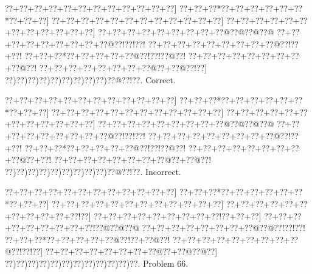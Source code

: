 \documentclass[a5paper]{article}
\begin{document}
\begin{center}
{\goo
\0??+\0??+\0??+\0??+\0??+\0??+\0??+\0??+\0??+\0??+\0??+\0??]
\0??+\0??+\0??*\0??+\0??+\0??+\0??+\0??+\0??*\0??+\0??+\0??]
\0??+\0??+\0??+\0??+\0??+\0??+\0??+\0??+\0??+\0??+\0??+\0??]
\0??+\0??+\0??+\0??+\0??+\0??+\0??+\0??+\0??+\0??+\0??+\0??]
\0??+\0??+\0??+\0??+\0??+\0??+\0??+\0??+\0??@\0??@\0??@\0??@
\0??+\0??+\0??+\0??+\0??+\0??+\0??+\0??+\0??@\0??!\0??!\0??!
\0??+\0??+\0??+\0??+\0??+\0??+\0??+\0??+\0??@\0??!\0??+\0??!
\0??+\0??+\0??*\0??+\0??+\0??+\0??+\0??@\0??!\0??!\0??@\0??!
\0??+\0??+\0??+\0??+\0??+\0??+\0??+\0??+\0??@\0??!
\0??+\0??+\0??+\0??+\0??+\0??+\0??+\0??@\0??+\0??@\0??!\0??]
\0??)\0??)\0??)\0??)\0??)\0??)\0??)\0??)\0??)\0??@\0??!\0??.
}
Correct. 

\end{center}
\begin{center}
{\goo
\0??+\0??+\0??+\0??+\0??+\0??+\0??+\0??+\0??+\0??+\0??+\0??]
\0??+\0??+\0??*\0??+\0??+\0??+\0??+\0??+\0??*\0??+\0??+\0??]
\0??+\0??+\0??+\0??+\0??+\0??+\0??+\0??+\0??+\0??+\0??+\0??]
\0??+\0??+\0??+\0??+\0??+\0??+\0??+\0??+\0??+\0??+\0??+\0??]
\0??+\0??+\0??+\0??+\0??+\0??+\0??+\0??+\0??@\0??@\0??@\0??@
\0??+\0??+\0??+\0??+\0??+\0??+\0??+\0??+\0??@\0??!\0??!\0??!
\0??+\0??+\0??+\0??+\0??+\0??+\0??+\0??+\0??@\0??!\0??+\0??!
\0??+\0??+\0??*\0??+\0??+\0??+\0??+\0??@\0??!\0??!\0??@\0??!
\0??+\0??+\0??+\0??+\0??+\0??+\0??+\0??+\0??@\0??+\0??!
\0??+\0??+\0??+\0??+\0??+\0??+\0??+\0??@\0??+\0??@\0??!
\0??)\0??)\0??)\0??)\0??)\0??)\0??)\0??)\0??)\0??@\0??!\0??.
}
Incorrect. 

\end{center}
\newpage
\begin{center}
{\goo
\0??+\0??+\0??+\0??+\0??+\0??+\0??+\0??+\0??+\0??+\0??+\0??]
\0??+\0??+\0??*\0??+\0??+\0??+\0??+\0??+\0??*\0??+\0??+\0??]
\0??+\0??+\0??+\0??+\0??+\0??+\0??+\0??+\0??+\0??+\0??+\0??]
\0??+\0??+\0??+\0??+\0??+\0??+\0??+\0??+\0??+\0??+\0??!\0??]
\0??+\0??+\0??+\0??+\0??+\0??+\0??+\0??+\0??!\0??+\0??+\0??]
\0??+\0??+\0??+\0??+\0??+\0??+\0??+\0??+\0??!\0??@\0??@\0??@
\0??+\0??+\0??+\0??+\0??+\0??+\0??+\0??@\0??@\0??!\0??!\0??!
\0??+\0??+\0??*\0??+\0??+\0??+\0??+\0??@\0??!\0??+\0??@\0??!
\0??+\0??+\0??+\0??+\0??+\0??+\0??+\0??+\0??@\0??!\0??!\0??]
\0??+\0??+\0??+\0??+\0??+\0??+\0??+\0??@\0??+\0??@\0??@\0??]
\0??)\0??)\0??)\0??)\0??)\0??)\0??)\0??)\0??)\0??)\0??)\0??.
}
Problem 66.

\end{center}
\end{document}
